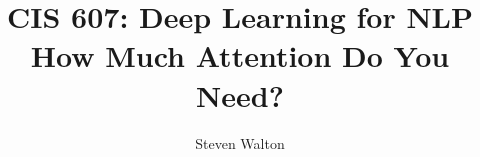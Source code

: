 \documentclass[12pt,letter]{article}
\begin{document}
\title{CIS 607: Deep Learning for NLP\\
    How Much Attention Do You Need?}
\author{Steven Walton}
\maketitle




\end{document}
